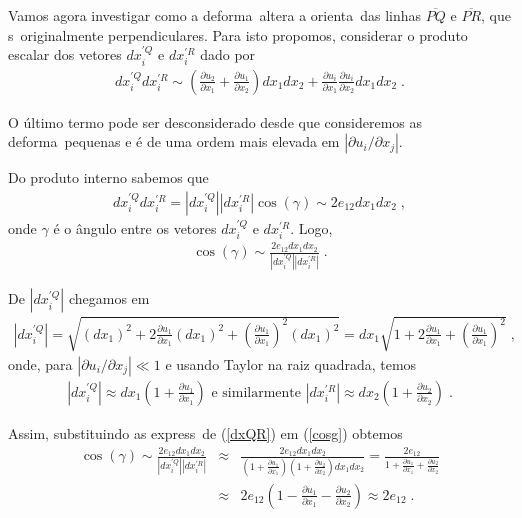 \begin{itemize}
Vamos agora investigar como a deforma\cao\ altera a orienta\cao\
das linhas $\overline{PQ}$ e $\overline{PR}$, que s\ao\
originalmente perpendiculares. Para isto propomos, considerar o
produto escalar dos vetores $dx_i^{'Q}$ e $dx_i^{'R}$ dado por
\begin{eqnarray}
dx_i^{'Q} dx_i^{'R} \sim \left( \frac{\partial u_2}{\partial x_1}
+ \frac{\partial u_1}{\partial x_2}\right) dx_1 dx_2 +
\frac{\partial u_i}{\partial x_1}  \frac{\partial u_i}
{\partial x_2} dx_1 dx_2 \; .
\end{eqnarray}

O \'ultimo termo pode ser desconsiderado desde que consideremos
as deforma\coes\ pequenas e \'e de uma ordem mais elevada em
$|\partial u_i/ \partial x_j|$.

Do produto interno sabemos que
\begin{eqnarray}
dx_i^{'Q} dx_i^{'R} = |dx_i^{'Q}| |dx_i^{'R}| \cos(\gamma)
\sim 2e_{12}dx_1 dx_2 \; ,
\end{eqnarray}
onde $\gamma$ \'e o \^angulo entre os vetores $dx_i^{'Q}$ e
$dx_i^{'R}$. Logo,
\begin{eqnarray} \label{cosg}
\cos(\gamma) \sim \frac{2e_{12}dx_1 dx_2}{|dx_i^{'Q}|
|dx_i^{'R}|} \; .
\end{eqnarray}

De $|dx_i^{'Q}|$ chegamos em
\begin{eqnarray*}
|dx_i^{'Q}| = \sqrt{(dx_1)^2 + 2 \frac{\partial u_1}{\partial x_1}
(dx_1)^2 + \left( \frac{\partial u_1}{\partial x_1} \right)^2
(dx_1)^2} = dx_1 \sqrt{1 + 2 \frac{\partial u_1}{\partial x_1}
+ \left( \frac{\partial u_1}{\partial x_1} \right)^2} \; ,
\end{eqnarray*}
onde, para $|\partial u_i/ \partial x_j| \ll 1$ e usando Taylor na
raiz quadrada, temos
\begin{eqnarray} \label{dxQR}
|dx_i^{'Q}| \approx dx_1 \left(1+\frac{\partial u_1}{\partial x_1}\right)
\mbox{ e similarmente } |dx_i^{'R}|
\approx dx_2 \left(1+\frac{\partial u_2}{\partial x_2}\right) \; .
\end{eqnarray}

Assim, substituindo as express\oes\ de (\ref{dxQR}) em (\ref{cosg})
obtemos
\begin{eqnarray} \label{app}
\cos(\gamma) \sim \frac{2e_{12}dx_1 dx_2}{|dx_i^{'Q}|
|dx_i^{'R}|} &\approx& \frac{2e_{12}dx_1 dx_2}{\left(1+\frac{\partial u_1}
{\partial x_1}\right) \left(1+\frac{\partial u_2}{\partial x_2}
\right) dx_1  dx_2} = \frac{2e_{12}}{1 + \frac{\partial u_1}
{\partial x_1} + \frac{\partial u_2}{\partial x_2}} \nonumber \\
&\approx& 2e_{12} \left(1 - \frac{\partial u_1}{\partial x_1} -
\frac{\partial u_2}{\partial x_2} \right) \approx 2e_{12} \; .
\end{eqnarray}


\end{itemize}
